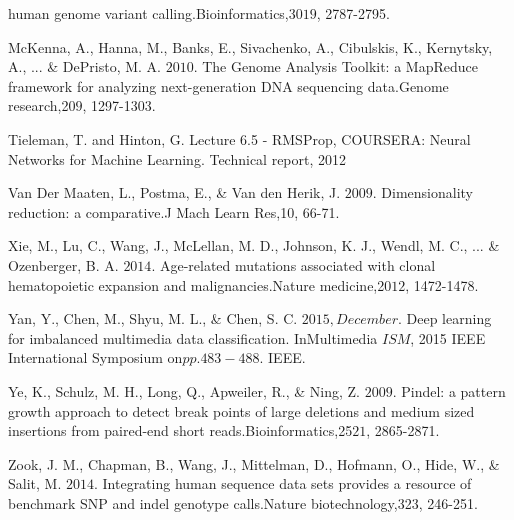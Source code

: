 \documentclass{article}
\begin{document}
\begin{list}{}{%
\setlength{\topsep}{0pt}%
\setlength{\leftmargin}{0.5in}%
\setlength{\listparindent}{-0.5in}%
\setlength{\itemindent}{-0.5in}%
\setlength{\parsep}{\parskip}%
}
human genome variant calling.Bioinformatics,30\(19\), 2787-2795.\\\item[] McKenna, A., Hanna, M., Banks, E., Sivachenko, A., Cibulskis, K., Kernytsky, A., ... \& DePristo, M. A. \(2010\). The Genome Analysis Toolkit: a MapReduce framework for analyzing next-generation DNA sequencing data.Genome research,20\(9\), 1297-1303.\\\item[] Tieleman, T. and Hinton, G. Lecture 6.5 - RMSProp, COURSERA: Neural Networks for Machine Learning. Technical report, 2012\\\item[] Van Der Maaten, L., Postma, E., \& Van den Herik, J. \(2009\). Dimensionality reduction: a comparative.J Mach Learn Res,10, 66-71.\\\item[] Xie, M., Lu, C., Wang, J., McLellan, M. D., Johnson, K. J., Wendl, M. C., ... \& Ozenberger, B. A. \(2014\). Age-related mutations associated with clonal hematopoietic expansion and malignancies.Nature medicine,20\(12\), 1472-1478.\\\item[] Yan, Y., Chen, M., Shyu, M. L., \& Chen, S. C. \(2015, December\). Deep learning for imbalanced multimedia data classification. InMultimedia \(ISM\), 2015 IEEE International Symposium on\(pp. 483-488\). IEEE.\\\item[] Ye, K., Schulz, M. H., Long, Q., Apweiler, R., \& Ning, Z. \(2009\). Pindel: a pattern growth approach to detect break points of large deletions and medium sized insertions from paired-end short reads.Bioinformatics,25\(21\), 2865-2871.\\\item[] Zook, J. M., Chapman, B., Wang, J., Mittelman, D., Hofmann, O., Hide, W., \& Salit, M. \(2014\). Integrating human sequence data sets provides a resource of benchmark SNP and indel genotype calls.Nature biotechnology,32\(3\), 246-251.\\


\end{list}
\end{document}
